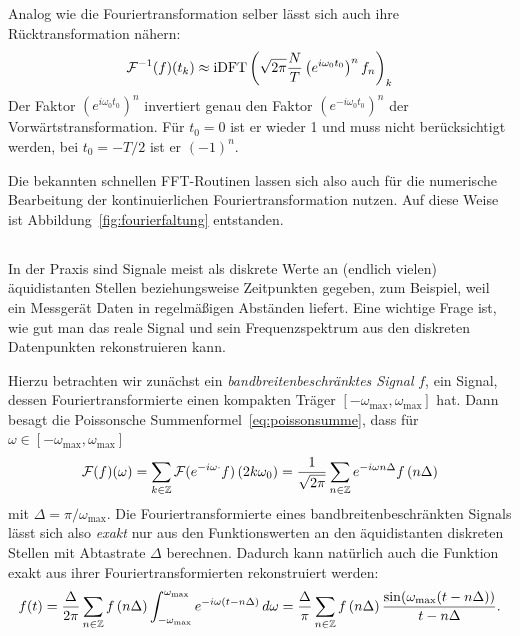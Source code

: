 Analog wie die Fouriertransformation selber lässt sich auch ihre
Rücktransformation nähern:
\begin{equation}
  \label{eq:idftcont}
  \mathcal F^{-1}(f)(t_k)\approx
  \text{iDFT}\left(\sqrt{2\pi}\frac{N}{T}\left(e^{i\omega_0 t_0}\right)^n f_n\right)_k
\end{equation}
Der Faktor $\left(e^{i\omega_0 t_0}\right)^n$ invertiert genau den
Faktor $\left(e^{-i\omega_0 t_0}\right)^n$ der
Vorwärtstransformation. Für $t_0=0$ ist er wieder 1 und muss nicht
berücksichtigt werden, bei $t_0=-T/2$ ist er $(-1)^n$.

Die bekannten schnellen FFT-Routinen lassen sich also auch für die
numerische Bearbeitung der kontinuierlichen Fouriertransformation
nutzen. Auf diese Weise ist \zb Abbildung~\ref{fig:fourierfaltung}
entstanden.

\subsection{}

In der Praxis sind Signale meist als diskrete Werte an (endlich
vielen) äquidistanten Stellen beziehungsweise Zeitpunkten gegeben, zum
Beispiel, weil ein Messgerät Daten in regelmäßigen Abständen liefert.
Eine wichtige Frage ist, wie gut man das reale Signal und sein
Frequenzspektrum aus den diskreten Datenpunkten rekonstruieren kann.

Hierzu betrachten wir zunächst ein \emph{bandbreitenbeschränktes
  Signal} $f$, \dh ein Signal, dessen Fouriertransformierte einen
kompakten Träger $[-\omega_\text{max},\omega_\text{max}]$ hat. Dann besagt die
Poissonsche Summenformel~\eqref{eq:poissonsumme}, dass für
$\omega\in[-\omega_\text{max},\omega_\text{max}]$
\begin{equation}
  \mathcal F(f)(\omega) =
  \sum_{k\in\mathbb{Z}}\mathcal F(e^{-i\omega \cdot} f)\left(2k\omega_0\right)
  =
  \frac{1}{\sqrt{2\pi}}
  \sum_{n\in\mathbb{Z}} e^{-i \omega n \Delta}f\left(n \Delta\right)
\end{equation}
mit $\Delta=\pi/\omega_\text{max}$. Die Fouriertransformierte eines
bandbreitenbeschränkten Signals lässt sich also \emph{exakt} nur aus
den Funktionswerten an den äquidistanten diskreten Stellen mit
Abtastrate $\Delta$ berechnen. Dadurch kann natürlich auch die
Funktion exakt aus ihrer Fouriertransformierten rekonstruiert werden:
\begin{equation}
  \label{eq:ftreconst}
  f(t)
  = \frac{\Delta}{2\pi}\sum_{n\in\mathbb{Z}} f\left(n \Delta\right)
  \int_{-\omega_\text{max}}^{\omega_\text{max}} e^{-i \omega (t - n\Delta)} \,d\omega
  = \frac{\Delta}{\pi}\sum_{n\in\mathbb{Z}} f\left(n \Delta\right)
  \frac{\sin(\omega_\text{max}(t-n\Delta))}{t-n\Delta}.
\end{equation}

